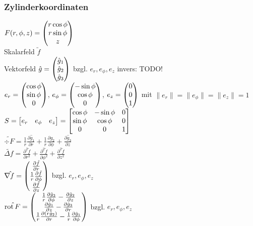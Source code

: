 \documentclass[german]{latex4ei/latex4ei_sheet}
\begin{document}
\subsubsection{Zylinderkoordinaten}
$F(r,\phi,z)=\begin{pmatrix} r \cos \phi \\ r \sin \phi \\ z \end{pmatrix}$\\
Skalarfeld $\utilde{f}$\\
Vektorfeld $\hat{g}=\begin{pmatrix} \hat{g}_1\\\hat{g}_2\\\hat{g}_3 \end{pmatrix}$ bzgl. $e_r,e_\phi,e_z$
invers: TODO!\\
$e_r=\begin{pmatrix} \cos \phi \\ \sin \phi \\ 0 \end{pmatrix}$, $e_\phi=\begin{pmatrix} -\sin \phi \\ \cos \phi \\ 0 \end{pmatrix}$, $e_z=\begin{pmatrix} 0 \\ 0 \\ 1 \end{pmatrix}$ mit $\|e_r\|=\|e_\phi\|=\|e_z\|=1$\\
$S=\mat{e_r & e_\phi & e_z} = \mat{ \cos \phi & -\sin \phi & 0 \\ \sin \phi & \cos \phi & 0 \\ 0 & 0 & 1}$\\
$\tilde{\div F}=\frac{1}{r}\frac{\partial \hat{g}_1}{\partial r}+ \frac{1}{r}\frac{\partial \hat{g}_2}{\partial \phi}+\frac{\partial \hat{g}_3}{\partial z}$ \\
$\tilde{\Delta f}=\frac{\partial^2 \tilde{f}}{\partial r^2}+\frac{\partial^2 \tilde{f}}{\partial \phi^2}+\frac{\partial^2 \tilde{f}}{\partial z^2}$ \\
$\hat{\nabla f}=\begin{pmatrix} \frac{\partial \tilde{f}}{\partial r	}\\\frac{1}{r}\frac{\partial \tilde{f}}{\partial \phi}\\\frac{\partial \tilde{f}}{\partial z} \end{pmatrix}$ bzgl. $e_r,e_\phi,e_z$\\
$\hat{\operatorname{rot} F}=\begin{pmatrix} \frac{1}{r}\frac{\partial \hat{g}_3}{\partial \phi} - \frac{\partial \hat{g}_2}{\partial z}\\\frac{\partial \hat{g}_1}{\partial z} - \frac{\partial \hat{g}_3}{\partial r}\\\frac{1}{r}\frac{\partial (r \hat{g}_2)}{\partial r} - \frac{1}{r}\frac{\partial \hat{g}_1}{\partial \phi} \end{pmatrix}$ bzgl. $e_r,e_\phi,e_z$\\
\end{document}
